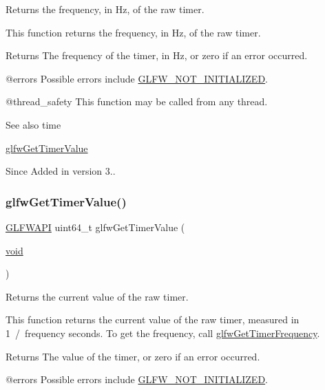 Returns the frequency, in Hz, of the raw timer. 

This function returns the frequency, in Hz, of the raw timer.

\begin{DoxyReturn}{Returns}
The frequency of the timer, in Hz, or zero if an error occurred.
\end{DoxyReturn}
@errors Possible errors include \mbox{\hyperlink{group__errors_ga2374ee02c177f12e1fa76ff3ed15e14a}{G\+L\+F\+W\+\_\+\+N\+O\+T\+\_\+\+I\+N\+I\+T\+I\+A\+L\+I\+Z\+ED}}.

@thread\+\_\+safety This function may be called from any thread.

\begin{DoxySeeAlso}{See also}
time 

\mbox{\hyperlink{group__input_gaa00c3e32227eb70b3968fca0bfe4ae26}{glfw\+Get\+Timer\+Value}}
\end{DoxySeeAlso}
\begin{DoxySince}{Since}
Added in version 3.. 
\end{DoxySince}
\mbox{\label{group__input_gaa00c3e32227eb70b3968fca0bfe4ae26}} 
\subsubsection{\texorpdfstring{glfwGetTimerValue()}{glfwGetTimerValue()}}
{\footnotesize\ttfamily \mbox{\hyperlink{glfw3_8h_a56da5036b2cc259351ae22fd6439bb47}{G\+L\+F\+W\+A\+PI}} uint64\+\_\+t glfw\+Get\+Timer\+Value (\begin{DoxyParamCaption}\item[{\mbox{\hyperlink{glad_8h_a950fc91edb4504f62f1c577bf4727c29}{void}}}]{ }\end{DoxyParamCaption})}



Returns the current value of the raw timer. 

This function returns the current value of the raw timer, measured in 1~/~frequency seconds. To get the frequency, call \mbox{\hyperlink{group__input_gaa92d10b10013372778efbf6367714371}{glfw\+Get\+Timer\+Frequency}}.

\begin{DoxyReturn}{Returns}
The value of the timer, or zero if an error occurred.
\end{DoxyReturn}
@errors Possible errors include \mbox{\hyperlink{group__errors_ga2374ee02c177f12e1fa76ff3ed15e14a}{G\+L\+F\+W\+\_\+\+N\+O\+T\+\_\+\+I\+N\+I\+T\+I\+A\+L\+I\+Z\+ED}}.

